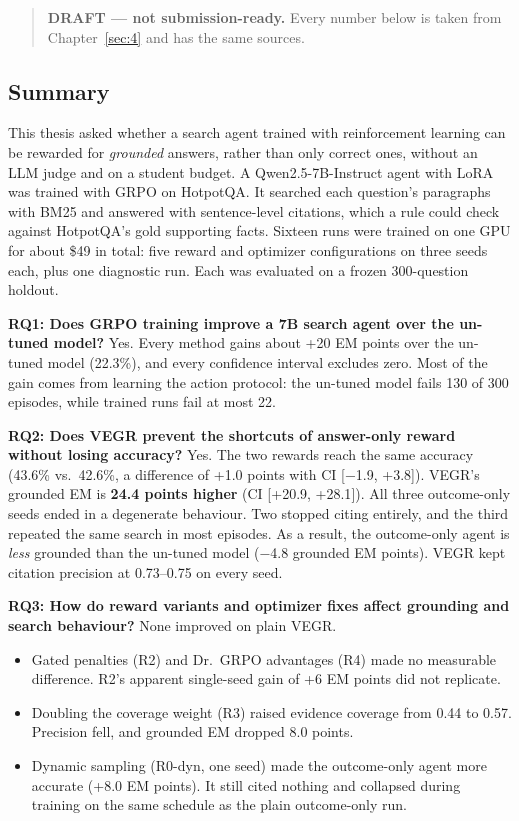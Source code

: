 
\begin{quote}
\textbf{DRAFT --- not submission-ready.} Every number below is taken
from Chapter~\ref{sec:4} and has the same sources.
\end{quote}

\subsection{Summary}\label{sec:5.1}

This thesis asked whether a search agent trained with reinforcement
learning can be rewarded for \emph{grounded} answers, rather than only
correct ones, without an LLM judge and on a student budget. A
Qwen2.5-7B-Instruct agent with LoRA was trained with GRPO on HotpotQA.
It searched each question's paragraphs with BM25 and answered with
sentence-level citations, which a rule could check against HotpotQA's
gold supporting facts. Sixteen runs were trained on one GPU for about
\$49 in total: five reward and optimizer configurations on three seeds
each, plus one diagnostic run. Each was evaluated on a frozen
300-question holdout.

\textbf{RQ1: Does GRPO training improve a 7B search agent over the
un-tuned model?} Yes. Every method gains about +20 EM points over the
un-tuned model (22.3\%), and every confidence interval excludes zero.
Most of the gain comes from learning the action protocol: the un-tuned
model fails 130 of 300 episodes, while trained runs fail at most 22.

\textbf{RQ2: Does VEGR prevent the shortcuts of answer-only reward
without losing accuracy?} Yes. The two rewards reach the same accuracy
(43.6\% vs.~42.6\%, a difference of +1.0 points with CI {[}−1.9,
+3.8{]}). VEGR's grounded EM is \textbf{24.4 points higher} (CI
{[}+20.9, +28.1{]}). All three outcome-only seeds ended in a degenerate
behaviour. Two stopped citing entirely, and the third repeated the same
search in most episodes. As a result, the outcome-only agent is
\emph{less} grounded than the un-tuned model (−4.8 grounded EM points).
VEGR kept citation precision at 0.73--0.75 on every seed.

\textbf{RQ3: How do reward variants and optimizer fixes affect grounding
and search behaviour?} None improved on plain VEGR.

\begin{itemize}
\tightlist
\item
  Gated penalties (R2) and Dr.~GRPO advantages (R4) made no measurable
  difference. R2's apparent single-seed gain of +6 EM points did not
  replicate.
\item
  Doubling the coverage weight (R3) raised evidence coverage from 0.44
  to 0.57. Precision fell, and grounded EM dropped 8.0 points.
\item
  Dynamic sampling (R0-dyn, one seed) made the outcome-only agent more
  accurate (+8.0 EM points). It still cited nothing and collapsed during
  training on the same schedule as the plain outcome-only run.
\end{itemize}

